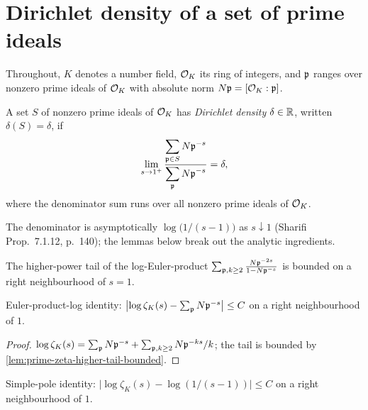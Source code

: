 \section{Dirichlet density of a set of prime ideals}

Throughout, $K$ denotes a number field, $\mathcal{O}_K$ its ring of integers, and
$\mathfrak{p}$ ranges over nonzero prime ideals of $\mathcal{O}_K$ with absolute norm
$N\mathfrak{p}=[\mathcal{O}_K:\mathfrak{p}]$.

\begin{definition}\label{def:dirichlet-density}
  \leanok
  A set $S$ of nonzero prime ideals of $\mathcal{O}_K$ has \emph{Dirichlet
  density} $\delta\in\mathbb{R}$, written $\delta(S)=\delta$, if
  \[
    \lim_{s\to 1^+}
    \frac{\displaystyle\sum_{\mathfrak{p}\in S} N\mathfrak{p}^{-s}}
         {\displaystyle\sum_{\mathfrak{p}} N\mathfrak{p}^{-s}}
    = \delta,
  \]
  where the denominator sum runs over all nonzero prime ideals of
  $\mathcal{O}_K$.
\end{definition}

The denominator is asymptotically $\log\bigl(1/(s-1)\bigr)$ as
$s\downarrow 1$ (Sharifi Prop.~7.1.12, p.~140); the lemmas below break
out the analytic ingredients.

\begin{lemma}\label{lem:prime-zeta-higher-tail-bounded}
  The higher-power tail of the log-Euler-product
  $\sum_{\mathfrak{p},k\ge 2}\frac{N\mathfrak{p}^{-2s}}{1-N\mathfrak{p}^{-s}}$ is bounded on a
  right neighbourhood of $s=1$.
\end{lemma}

\begin{lemma}\label{lem:logzeta-eq-primesum-bounded}
  Euler-product-log identity:
  $\bigl|\log\zeta_K(s) - \sum_{\mathfrak{p}} N\mathfrak{p}^{-s}\bigr| \le C$ on a right
  neighbourhood of $1$.
\end{lemma}

\begin{proof}
  $\log\zeta_K(s) = \sum_{\mathfrak{p}} N\mathfrak{p}^{-s} +
  \sum_{\mathfrak{p},k\ge2} N\mathfrak{p}^{-ks}/k$; the tail is bounded by
  \cref{lem:prime-zeta-higher-tail-bounded}.
\end{proof}

\begin{lemma}\label{lem:logzeta-eq-loginv-bounded}
  \leanok
  Simple-pole identity:
  $\bigl|\log\zeta_K(s) - \log(1/(s-1))\bigr| \le C$ on a right
  neighbourhood of $1$.
\end{lemma}

